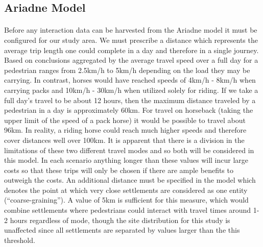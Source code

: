 \documentclass[12pt,a4paper]{thesis}
\begin{document}

\subsection{Ariadne Model}
	
\paragraph{}
Before any interaction data can be harvested from the Ariadne model it must be configured for our study area. We must prescribe a distance which represents the average trip length one could complete in a day and therefore in a single journey. Based on conclusions aggregated by \cite{BevForthcoming} the average travel speed over a full day for a pedestrian ranges from 2.5km/h to 5km/h depending on the load they may be carrying. In contrast, horses would have reached speeds of 4km/h - 8km/h when carrying packs and 10km/h - 30km/h when utilized solely for riding. If we take a full day's travel to be about 12 hours, then the maximum distance traveled by a pedestrian in a day is approximately 60km. For travel on horseback (taking the upper limit of the speed of a pack horse) it would be possible to travel about 96km. In reality, a riding horse could reach much higher speeds and therefore cover distances well over 100km. It is apparent that there is a division in the limitations of these two different travel modes and so both will be considered in this model. In each scenario anything longer than these values will incur large costs so that these trips will only be chosen if there are ample benefits to outweigh the costs. An additional distance must be specified in the model which denotes the point at which very close settlements are considered as one entity (``coarse-graining''). A value of 5km is sufficient for this measure, which would combine settlements where pedestrians could interact with travel times around 1-2 hours regardless of mode, though the site distribution for this study is unaffected since all settlements are separated by values larger than the this threshold. 
\end{document}
